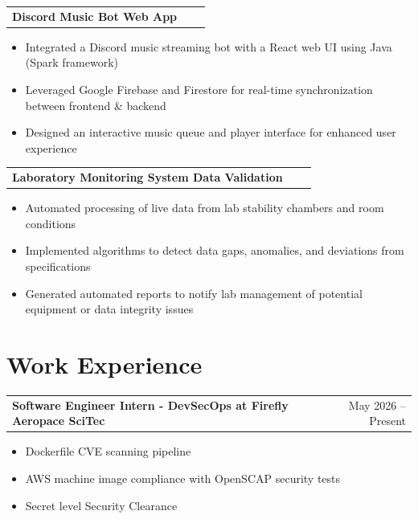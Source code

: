 \documentclass[letter,12pt]{article}
\makeatletter
\newenvironment{joblong}[2]
    {
    \begin{tabularx}{\linewidth}{@{}l X r@{}}
    \textbf{#1} & \hfill &  #2 \\[3.75pt]
    \end{tabularx}
    \begin{minipage}[t]{\linewidth}
    \begin{itemize}[leftmargin=1em, label=--]
    }
    {
    \end{itemize}
    \end{minipage}    
    }
\makeatother
\begin{document}
\begin{joblong}{Discord Music Bot Web App}{}
    \item Integrated a Discord music streaming bot with a React web UI using Java (Spark framework)
    \item Leveraged Google Firebase and Firestore for real-time synchronization between frontend \& backend
    \item Designed an interactive music queue and player interface for enhanced user experience
\end{joblong}

\begin{joblong}{Laboratory Monitoring System Data Validation}{}
    \item Automated processing of live data from lab stability chambers and room conditions
    \item Implemented algorithms to detect data gaps, anomalies, and deviations from specifications
    \item Generated automated reports to notify lab management of potential equipment or data integrity issues
\end{joblong}

\section{Work Experience}

\begin{joblong}{Software Engineer Intern - DevSecOps at Firefly Aeropace SciTec}{May 2026 -- Present}

    \item Dockerfile CVE scanning pipeline
    \item AWS machine image compliance with OpenSCAP security tests
    \item Secret level Security Clearance
    
\end{joblong}
\end{document}

